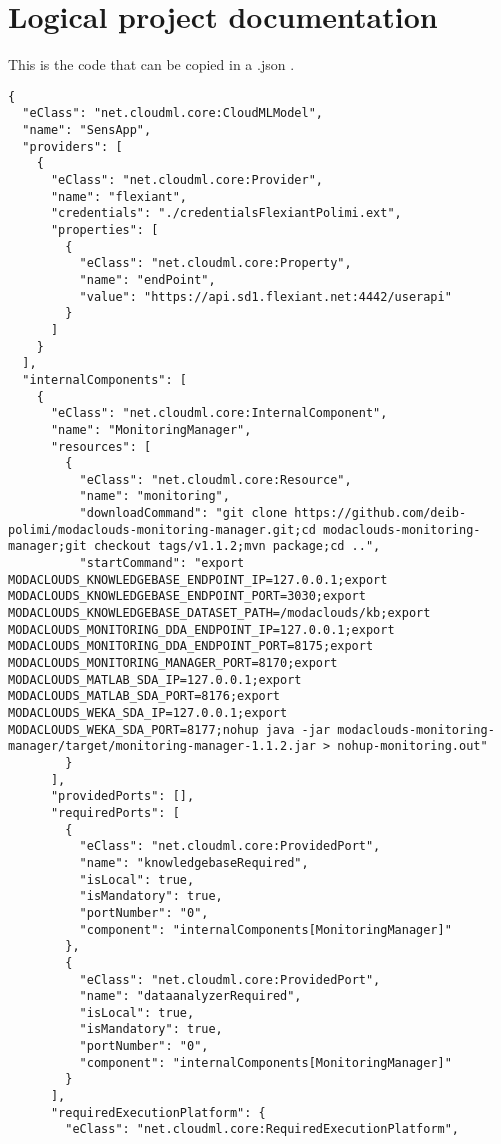 \chapter{Logical project documentation}
\label{appA}

This is the code that can be copied in a .json .

\begin{lstlisting}[mathescape,caption={The .json to deplot the \mm on Flexiant},label={lst:mpflexi}]
{
  "eClass": "net.cloudml.core:CloudMLModel",
  "name": "SensApp",
  "providers": [
    {
      "eClass": "net.cloudml.core:Provider",
      "name": "flexiant",
      "credentials": "./credentialsFlexiantPolimi.ext",
      "properties": [
        {
          "eClass": "net.cloudml.core:Property",
          "name": "endPoint",
          "value": "https://api.sd1.flexiant.net:4442/userapi"
        }
      ]
    }
  ],
  "internalComponents": [
    {
      "eClass": "net.cloudml.core:InternalComponent",
      "name": "MonitoringManager",
      "resources": [
        {
          "eClass": "net.cloudml.core:Resource",
          "name": "monitoring",
          "downloadCommand": "git clone https://github.com/deib-polimi/modaclouds-monitoring-manager.git;cd modaclouds-monitoring-manager;git checkout tags/v1.1.2;mvn package;cd ..",
          "startCommand": "export MODACLOUDS_KNOWLEDGEBASE_ENDPOINT_IP=127.0.0.1;export MODACLOUDS_KNOWLEDGEBASE_ENDPOINT_PORT=3030;export MODACLOUDS_KNOWLEDGEBASE_DATASET_PATH=/modaclouds/kb;export MODACLOUDS_MONITORING_DDA_ENDPOINT_IP=127.0.0.1;export MODACLOUDS_MONITORING_DDA_ENDPOINT_PORT=8175;export MODACLOUDS_MONITORING_MANAGER_PORT=8170;export MODACLOUDS_MATLAB_SDA_IP=127.0.0.1;export MODACLOUDS_MATLAB_SDA_PORT=8176;export MODACLOUDS_WEKA_SDA_IP=127.0.0.1;export MODACLOUDS_WEKA_SDA_PORT=8177;nohup java -jar modaclouds-monitoring-manager/target/monitoring-manager-1.1.2.jar > nohup-monitoring.out"
        }
      ],
      "providedPorts": [],
      "requiredPorts": [
        {
          "eClass": "net.cloudml.core:ProvidedPort",
          "name": "knowledgebaseRequired",
          "isLocal": true,
          "isMandatory": true,
          "portNumber": "0",
          "component": "internalComponents[MonitoringManager]"
        },
        {
          "eClass": "net.cloudml.core:ProvidedPort",
          "name": "dataanalyzerRequired",
          "isLocal": true,
          "isMandatory": true,
          "portNumber": "0",
          "component": "internalComponents[MonitoringManager]"
        }
      ],
      "requiredExecutionPlatform": {
        "eClass": "net.cloudml.core:RequiredExecutionPlatform",

\end{lstlisting}
